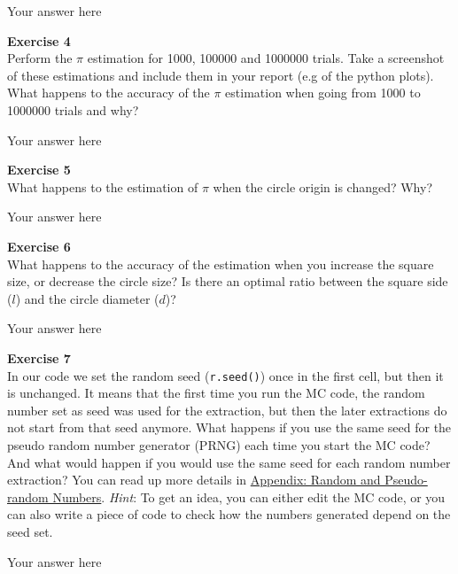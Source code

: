 \documentclass{article}
\begin{document}
Your answer here

\begin{mdframed}
\textbf{Exercise 4}\\
Perform the $\pi$ estimation for 1000, 100000 and 1000000 trials. Take a screenshot of these estimations and include them in your report (e.g of the python plots). What happens to the accuracy of the $\pi$ estimation when going from 1000 to 1000000 trials and why?
\end{mdframed}

Your answer here

\begin{mdframed}
\textbf{Exercise 5}\\
What happens to the estimation of $\pi$ when the circle origin is changed? Why?
\end{mdframed}

Your answer here

\begin{mdframed}
\textbf{Exercise 6}\\
What happens to the accuracy of the estimation when you increase the square size, or decrease the circle size? Is there an optimal ratio between the square side ($l$) and the circle diameter ($d$)?
\end{mdframed}

Your answer here

\begin{mdframed}
\textbf{Exercise 7}\\
In our code we set the random seed (\texttt{r.seed()}) once in the first cell, but then it is unchanged. It means that the first time you run the MC code, the random number set as seed was used for the extraction, but then the later extractions do not start from that seed anymore. What happens if you use the same seed for the pseudo random number generator (PRNG) each time you start the MC code? And what would happen if you would use the same seed for each random number extraction? You can read up more details in \href{https://lcbc-epfl.github.io/mdmc-public/Ex1/prng.html}{Appendix: Random and Pseudo-random Numbers}.
\textit{Hint}: To get an idea, you can either edit the MC code, or you can also write a piece of code to check how the numbers generated depend on the seed set.
\end{mdframed}

Your answer here
\end{document}
